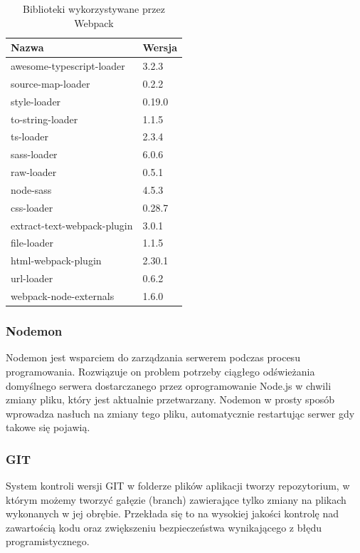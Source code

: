 \documentclass[eng,printmode]{mgr}
\begin{document}
\begin{table}[H]
\begin{tabularx}{\textwidth}{|X|X|}
   \hline
    \textbf{Nazwa} & \textbf{Wersja} \\
   \hline
     awesome-typescript-loader & 3.2.3 \\
   \hline
     source-map-loader & 0.2.2 \\
   \hline
     style-loader & 0.19.0 \\
   \hline
  	 to-string-loader & 1.1.5 \\
   \hline
   	 ts-loader & 2.3.4 \\
   \hline
   	 sass-loader & 6.0.6 \\
   \hline
   	 raw-loader & 0.5.1 \\
   \hline
   	 node-sass & 4.5.3 \\
   \hline
   	 css-loader & 0.28.7 \\
   \hline
     extract-text-webpack-plugin & 3.0.1 \\
   \hline
     file-loader & 1.1.5 \\
   \hline
     html-webpack-plugin & 2.30.1 \\
   \hline
     url-loader & 0.6.2 \\
   \hline
     webpack-node-externals & 1.6.0 \\
   \hline
\end{tabularx}
\caption{Biblioteki wykorzystywane przez Webpack}
\end{table}
   
\subsubsection{Nodemon}
Nodemon\cite{Nodemon} jest wsparciem do zarządzania serwerem podczas procesu programowania. Rozwiązuje on problem potrzeby ciągłego odświeżania domyślnego serwera dostarczanego przez oprogramowanie Node.js w chwili zmiany pliku, który jest aktualnie przetwarzany. Nodemon w prosty sposób wprowadza nasłuch na zmiany tego pliku, automatycznie restartując serwer gdy takowe się pojawią.

\subsubsection{GIT}
System kontroli wersji GIT\cite{GIT} w folderze plików aplikacji tworzy repozytorium, w którym możemy tworzyć gałęzie (branch) zawierające tylko zmiany na plikach wykonanych w jej obrębie. Przekłada się to na wysokiej jakości kontrolę nad zawartością kodu oraz zwiększeniu bezpieczeństwa wynikającego z błędu programistycznego. 
\end{document}
